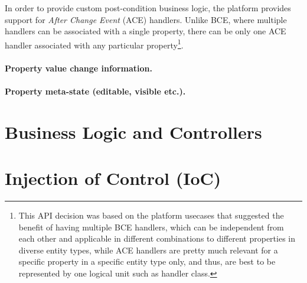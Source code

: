   In order to provide custom post-condition business logic, the platform provides support for \emph{After Change Event} (ACE) handlers.
  Unlike BCE, where multiple handlers can be associated with a single property, there can be only one ACE handler associated with any particular property\footnote{This API decision was based on the platform usecases that suggested the benefit of having multiple BCE handlers, which can be independent from each other and applicable in different combinations to different properties in diverse entity types, while ACE handlers are pretty much relevant for a specific property in a specific entity type only, and thus, are best to be represented by one logical unit such as handler class.}.

  \paragraph*{Property value change information.}
  \paragraph*{Property meta-state (editable, visible etc.).}

\section{Business Logic and Controllers}

% 
% 
% 
% 
\section{Injection of Control (IoC)}\label{ch01:01:IoC}
